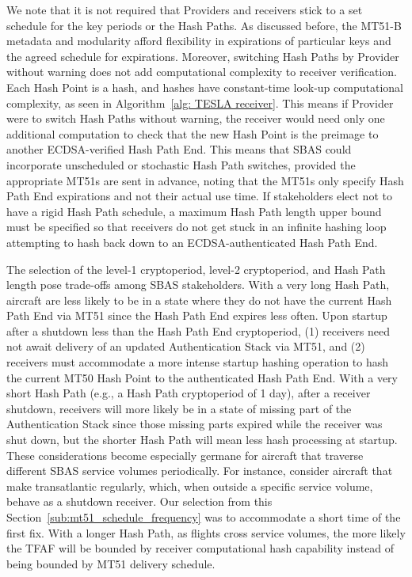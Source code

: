 \documentclass[letterpaper,times]{IONconf/IONconf}
\begin{document}
		We note that it is not required that Providers and receivers stick to a set schedule for the key periods or the Hash Paths.
		As discussed before, the MT51-B metadata and modularity afford flexibility in expirations of particular keys and the agreed schedule for expirations.
		Moreover, switching Hash Paths by Provider without warning does not add computational complexity to receiver verification.
		Each Hash Point is a hash, and hashes have constant-time look-up computational complexity, as seen in Algorithm~\ref{alg: TESLA receiver}.
		This means if Provider were to switch Hash Paths without warning, the receiver would need only one additional computation to check that the new Hash Point is the preimage to another ECDSA-verified Hash Path End.
		This means that SBAS could incorporate unscheduled or stochastic Hash Path switches, provided the appropriate MT51s are sent in advance, noting that the MT51s only specify Hash Path End expirations and not their actual use time.
		If stakeholders elect not to have a rigid Hash Path schedule, a maximum Hash Path length upper bound must be specified so that receivers do not get stuck in an infinite hashing loop attempting to hash back down to an ECDSA-authenticated Hash Path End.

		The selection of the level-1 cryptoperiod, level-2 cryptoperiod, and Hash Path length pose trade-offs among SBAS stakeholders.
		With a very long Hash Path, aircraft are less likely to be in a state where they do not have the current Hash Path End via MT51 since the Hash Path End expires less often.
		Upon startup after a shutdown less than the Hash Path End cryptoperiod, (1) receivers need not await delivery of an updated Authentication Stack via MT51, and (2) receivers must accommodate a more intense startup hashing operation to hash the current MT50 Hash Point to the authenticated Hash Path End.
		With a very short Hash Path (e.g., a Hash Path cryptoperiod of 1 day), after a receiver shutdown, receivers will more likely be in a state of missing part of the Authentication Stack since those missing parts expired while the receiver was shut down, but the shorter Hash Path will mean less hash processing at startup.
		These considerations become especially germane for aircraft that traverse different SBAS service volumes periodically.
		For instance, consider aircraft that make transatlantic regularly, which, when outside a specific service volume, behave as a shutdown receiver.
		Our selection from this Section~\ref{sub:mt51_schedule_frequency} was to accommodate a short time of the first fix.
		With a longer Hash Path, as flights cross service volumes, the more likely the TFAF will be bounded by receiver computational hash capability instead of being bounded by MT51 delivery schedule.
\end{document}
